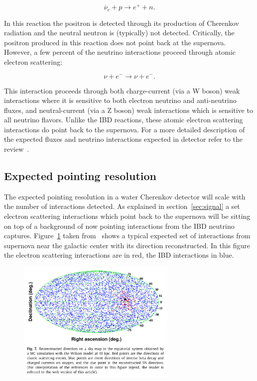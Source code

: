 \documentclass[11pt]{article}
\begin{document}
$$ \overline{\nu}_{e}+ p \rightarrow e^{+} + n. $$

In this reaction the positron is detected through its production of
Cherenkov radiation and the neutral neutron is (typically) not
detected.  Critically, the positron produced in this reaction does not
point back at the supernova.   However, a few percent of the neutrino interactions proceed
through atomic electron scattering:

$$ \nu + e^{-} \rightarrow \nu + e^{-} .$$

This interaction proceeds through both charge-current (via a W boson)
weak interactions where it is sensitive to both electron neutrino and
anti-neutrino fluxes, and neutral-current (via a Z boson) weak
interactions which is sensitive to all neutrino flavors. Unlike the
IBD reactions, these atomic electron scattering interactions do point
back to the supernova.  For a more detailed description of the
expected fluxes and neutrino interactions expected in detector refer
to the review~\cite{2012ARNPS..62...81S}.

\subsection{Expected pointing resolution}

The expected pointing resolution in a water Cherenkov detector will
scale with the number of interactions detected.  As explained in
section~\ref{sec:signal} a set electron scattering interactions which
point back to the supernova will be sitting on top of a background of
now pointing interactions from the IBD neutrino captures.
Figure~\ref{fig:SK-realtime-monitor-pointing} taken
from~\cite{2016APh....81...39A} shows a typical expected set of
interactions from supernova near the galactic center with its
direction reconstructed.  In this figure the electron scattering
interactions are in red, the IBD interactions in blue.

\begin{figure}
  \begin{center}
    \includegraphics[width=3.0in]{SK-realtime-monitor-pointing}
    \caption{}
    \label{fig:SK-realtime-monitor-pointing}
  \end{center}
\end{figure}
\end{document}
